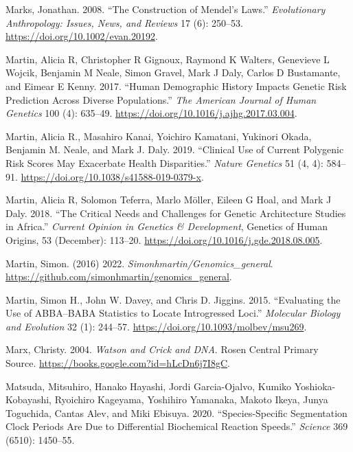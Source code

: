 \documentclass[
]{book}
\newlength{\cslhangindent}
\newlength{\cslentryspacingunit} %
\newenvironment{CSLReferences}[2] %
 {%
  \setlength{\parindent}{0pt}
  \ifodd #1
  \let\oldpar\par
  \def\par{\hangindent=\cslhangindent\oldpar}
  \fi
  \setlength{\parskip}{#2\cslentryspacingunit}
 }%
 {}
\begin{document}
\begin{CSLReferences}{1}{0}
\leavevmode{}%
Marks, Jonathan. 2008. {``The Construction of {Mendel}'s Laws.''} \emph{Evolutionary Anthropology: Issues, News, and Reviews} 17 (6): 250--53. \url{https://doi.org/10.1002/evan.20192}.

\leavevmode{}%
Martin, Alicia R, Christopher R Gignoux, Raymond K Walters, Genevieve L Wojcik, Benjamin M Neale, Simon Gravel, Mark J Daly, Carlos D Bustamante, and Eimear E Kenny. 2017. {``Human Demographic History Impacts Genetic Risk Prediction Across Diverse Populations.''} \emph{The American Journal of Human Genetics} 100 (4): 635--49. \url{https://doi.org/10.1016/j.ajhg.2017.03.004}.

\leavevmode{}%
Martin, Alicia R., Masahiro Kanai, Yoichiro Kamatani, Yukinori Okada, Benjamin M. Neale, and Mark J. Daly. 2019. {``Clinical Use of Current Polygenic Risk Scores May Exacerbate Health Disparities.''} \emph{Nature Genetics} 51 (4, 4): 584--91. \url{https://doi.org/10.1038/s41588-019-0379-x}.

\leavevmode{}%
Martin, Alicia R, Solomon Teferra, Marlo Möller, Eileen G Hoal, and Mark J Daly. 2018. {``The Critical Needs and Challenges for Genetic Architecture Studies in {Africa}.''} \emph{Current Opinion in Genetics \& Development}, Genetics of {Human Origins}, 53 (December): 113--20. \url{https://doi.org/10.1016/j.gde.2018.08.005}.

\leavevmode{}%
Martin, Simon. (2016) 2022. \emph{Simonhmartin/Genomics\_general}. \url{https://github.com/simonhmartin/genomics_general}.

\leavevmode{}%
Martin, Simon H., John W. Davey, and Chris D. Jiggins. 2015. {``Evaluating the {Use} of {ABBA}--{BABA Statistics} to {Locate Introgressed Loci}.''} \emph{Molecular Biology and Evolution} 32 (1): 244--57. \url{https://doi.org/10.1093/molbev/msu269}.

\leavevmode{}%
Marx, Christy. 2004. \emph{Watson and {Crick} and {DNA}}. {Rosen Central Primary Source}. \url{https://books.google.com?id=hLcDn6j7I8gC}.

\leavevmode{}%
Matsuda, Mitsuhiro, Hanako Hayashi, Jordi Garcia-Ojalvo, Kumiko Yoshioka-Kobayashi, Ryoichiro Kageyama, Yoshihiro Yamanaka, Makoto Ikeya, Junya Toguchida, Cantas Alev, and Miki Ebisuya. 2020. {``Species-Specific Segmentation Clock Periods Are Due to Differential Biochemical Reaction Speeds.''} \emph{Science} 369 (6510): 1450--55.


\end{CSLReferences}
\end{document}
